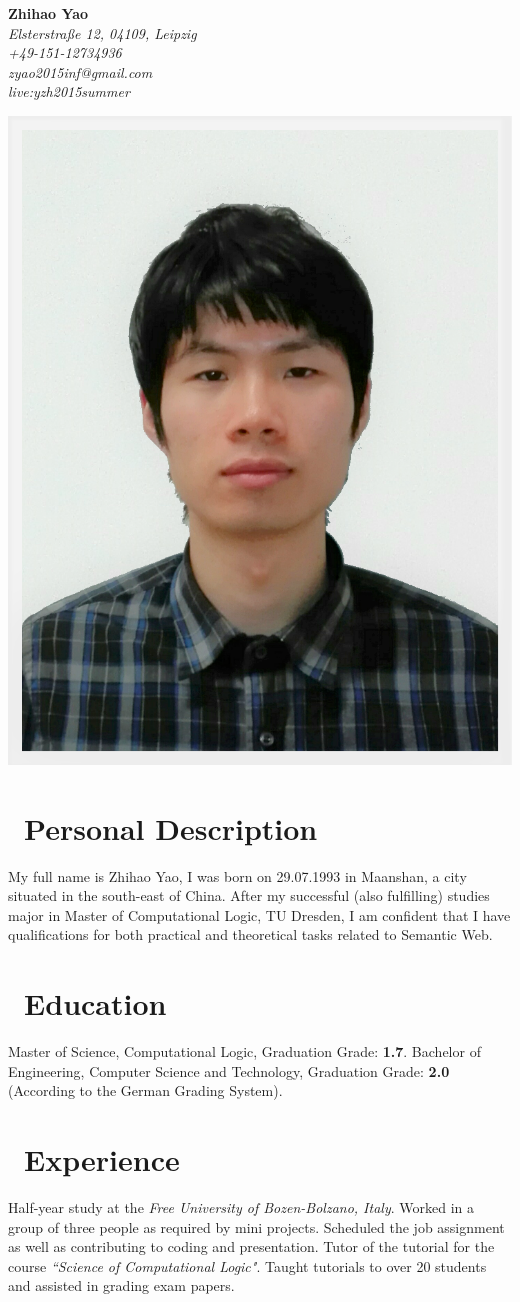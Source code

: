\documentclass{my_cv}
\begin{document}
	\thispagestyle{empty}
	\noindent
	\begin{minipage}[t]{.5\linewidth}
		\raggedright 
		\vspace{-2cm}
		{\bfseries \Huge Zhihao Yao}\\
		\small\itshape
		\faHome \hspace{1mm}  Elsterstraße 12, 04109, Leipzig\\
		\faMobilePhone\hspace{1mm} +49-151-12734936\\
		\faEnvelopeO \hspace{1mm} zyao2015inf@gmail.com\\
		\faSkype \hspace{1mm} live:yzh2015summer
	\end{minipage}
	\begin{minipage}[t]{.5\linewidth}
		\raggedleft 
		\includegraphics[width=.3\linewidth]{bewerbung.png}
	\end{minipage}
	\section{\faMale\ Personal Description}
	My full name is Zhihao Yao, I was born on 29.07.1993 in Maanshan, a city situated in the south-east of China. After my successful (also fulfilling) studies major in Master of Computational Logic, TU Dresden, I am confident that I have qualifications for both practical and theoretical tasks related to Semantic Web.
	\section{\faGraduationCap\ Education}
	Master of Science, Computational Logic, Graduation Grade: \textbf{1.7}.
	Bachelor of Engineering, Computer Science and Technology, Graduation Grade: \textbf{2.0} (According to the German Grading System). 
	\section{\faBriefcase\ Experience}
	Half-year study at the {\itshape Free University of Bozen-Bolzano, Italy}. Worked in a group of three people as required by mini projects. Scheduled the job assignment as well as contributing to coding and presentation. 
	Tutor of the tutorial for the course {\itshape``Science of Computational Logic"}. Taught tutorials to over 20 students and assisted in grading exam papers. 
\end{document}
